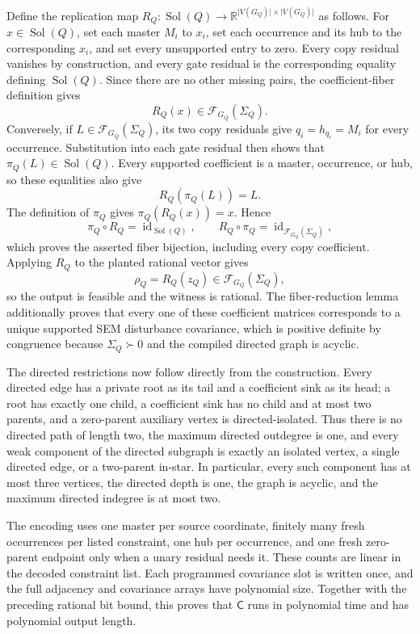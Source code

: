 Define the replication map \(R_Q:\operatorname{Sol}(Q)\to\mathbb R^{\lvert V(G_Q)\rvert\times\lvert V(G_Q)\rvert}\) as follows.  For \(x\in\operatorname{Sol}(Q)\), set each master \(M_i\) to \(x_i\), set each occurrence and its hub to the corresponding \(x_i\), and set every unsupported entry to zero.  Every copy residual vanishes by construction, and every gate residual is the corresponding equality defining \(\operatorname{Sol}(Q)\).  Since there are no other missing pairs, the coefficient-fiber definition gives
\[
R_Q(x)\in\mathcal F_{G_Q}(\Sigma_Q).
\]
Conversely, if \(L\in\mathcal F_{G_Q}(\Sigma_Q)\), its two copy residuals give \(q_i=h_{q_i}=M_i\) for every occurrence.  Substitution into each gate residual then shows that \(\pi_Q(L)\in\operatorname{Sol}(Q)\).  Every supported coefficient is a master, occurrence, or hub, so these equalities also give
\[
R_Q(\pi_Q(L))=L.
\]
The definition of \(\pi_Q\) gives \(\pi_Q(R_Q(x))=x\).  Hence
\[
\pi_Q\circ R_Q=\operatorname{id}_{\operatorname{Sol}(Q)},
\qquad
R_Q\circ\pi_Q=\operatorname{id}_{\mathcal F_{G_Q}(\Sigma_Q)},
\]
which proves the asserted fiber bijection, including every copy coefficient.  Applying \(R_Q\) to the planted rational vector gives
\[
\rho_Q=R_Q(z_Q)\in\mathcal F_{G_Q}(\Sigma_Q),
\]
so the output is feasible and the witness is rational.  The fiber-reduction lemma additionally proves that every one of these coefficient matrices corresponds to a unique supported SEM disturbance covariance, which is positive definite by congruence because \(\Sigma_Q\succ0\) and the compiled directed graph is acyclic.

The directed restrictions now follow directly from the construction.  Every directed edge has a private root as its tail and a coefficient sink as its head; a root has exactly one child, a coefficient sink has no child and at most two parents, and a zero-parent auxiliary vertex is directed-isolated.  Thus there is no directed path of length two, the maximum directed outdegree is one, and every weak component of the directed subgraph is exactly an isolated vertex, a single directed edge, or a two-parent in-star.  In particular, every such component has at most three vertices, the directed depth is one, the graph is acyclic, and the maximum directed indegree is at most two.

The encoding uses one master per source coordinate, finitely many fresh occurrences per listed constraint, one hub per occurrence, and one fresh zero-parent endpoint only when a unary residual needs it.  These counts are linear in the decoded constraint list.  Each programmed covariance slot is written once, and the full adjacency and covariance arrays have polynomial size.  Together with the preceding rational bit bound, this proves that \(\mathsf C\) runs in polynomial time and has polynomial output length.

